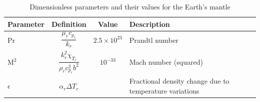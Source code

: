 \documentclass[document.tex]{subfiles}
\begin{document}
\begin{table}[ht]
    \centering
    \caption{Dimensionless parameters and their values for the Earth's mantle}
    \label{dimensionless parameters schubert}
    \renewcommand{\arraystretch}{1.8}   %
    \setlength{\tabcolsep}{12pt}        %
    \begin{tabular}{lccl}
        \toprule
        Parameter & Definition & Value & Description \\
        \midrule
        $\mathrm{Pr}$ & $\dfrac{\mu_r c_{p_r}}{k_r}$ & $2.5 \times 10^{23}$ & Prandtl number \\
        $\mathrm{M}^2$ & $\dfrac{k_r^2 \chi_{T_r}}{\rho_r c_{p_r}^2 b^2}$ & $10^{-33}$ & Mach number (squared) \\
        $\epsilon$ & $\alpha_r \Delta T_r$ & & Fractional density change due to temperature variations \\
        \bottomrule
    \end{tabular}
\end{table}
\end{document}

